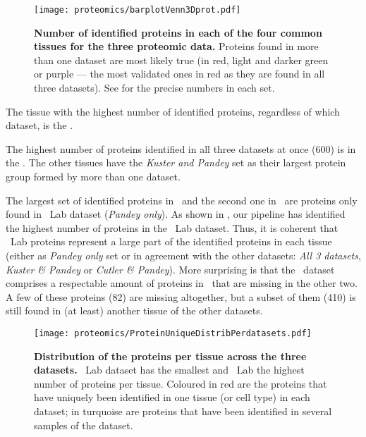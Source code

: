 \begin{figure}[!htbp]
    \texttt{[image: proteomics/barplotVenn3Dprot.pdf]}\centering
    \vspace{-3mm}
    \caption[Identified proteins across the 4 shared tissues for the 3 datasets]%
    {\label{fig:barplot3Dvennprot}\textbf{Number of identified
    proteins in each of the four common tissues for the three proteomic data.}
    Proteins found in more than one dataset are most likely true (in
    red, light and darker green or purple --- the most validated ones in red
    as they are found in all three datasets).
    See  for the precise numbers in each set.}
\end{figure}

The tissue with the highest number of identified proteins,
regardless of which dataset,
is the \ovary.\mybr\

The highest number of proteins identified in all three datasets at once (600)
is in the \heart.
The other tissues have
the \emph{Kuster and Pandey} set as
their largest protein group formed by more than one dataset.\mybr\

The largest set of identified proteins in \pancreas\
and the second one in \ovary\ are proteins only found in \pandey\ Lab dataset
(\emph{Pandey only}).
As shown in ,
our pipeline has identified the highest number of proteins in the \pandey\  Lab dataset.
Thus, it is coherent that \pandey\ Lab proteins represent a large part of
the identified proteins in each tissue (either as \emph{Pandey only} set or
in agreement with the other datasets:
\emph{All 3 datasets}, \emph{Kuster \& Pandey} or \emph{Cutler \& Pandey}).
More surprising is that the \cutler\ dataset comprises a respectable amount of
proteins in \lung\ that are missing in the other two.
A few of these proteins (82) are missing altogether,
but a subset of them (410) is still found
in (at least) another tissue of the other datasets.\mybr\

\begin{figure}[!htpb]
    \texttt{[image: proteomics/ProteinUniqueDistribPerdatasets.pdf]}\centering
    \caption[Distribution of the proteins per tissue]{\label{fig:distribProtUniq3D}%
    \textbf{Distribution of the proteins per tissue across the three datasets.}
    \cutler\ Lab dataset has the smallest and \pandey\ Lab the highest number of proteins
    per tissue.
    Coloured in red are the proteins that have uniquely been identified
    in one tissue (or cell type) in each dataset;
    in turquoise are proteins that have been identified in several samples
    of the dataset.}
\end{figure}

